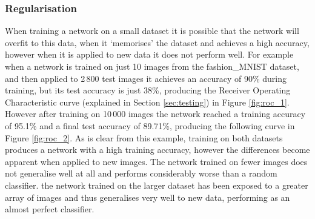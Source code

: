 \documentclass[12pt, onecolumn]{aa}
\begin{document}
\subsubsection{Regularisation}\label{sec:reguldeep}
When training a network on a small dataset it is possible that the network will overfit to this data, when it ‘memorises’ the dataset and achieves a high accuracy, however when it is applied to new data it does not perform well. For example when a network is trained on just 10 images from the fashion\_MNIST dataset, and then applied to 2\,800 test images it achieves an accuracy of 90\% during training, but its test accuracy is just 38\%, producing the Receiver Operating Characteristic curve (explained in Section \ref{sec:testing}) in Figure \ref{fig:roc_1}. However after training on 10\,000 images the network reached a training accuracy of 95.1\% and a final test accuracy of 89.71\%, producing the following curve in Figure \ref{fig:roc_2}. As is clear from this example, training on both datasets produces a network with a high training accuracy, however the differences become apparent when applied to new images. The network trained on fewer images does not generalise well at all and performs considerably worse than a random classifier. the network trained on the larger dataset has been exposed to a greater array of images and thus generalises very well to new data, performing as an almost perfect classifier. 
\end{document}
